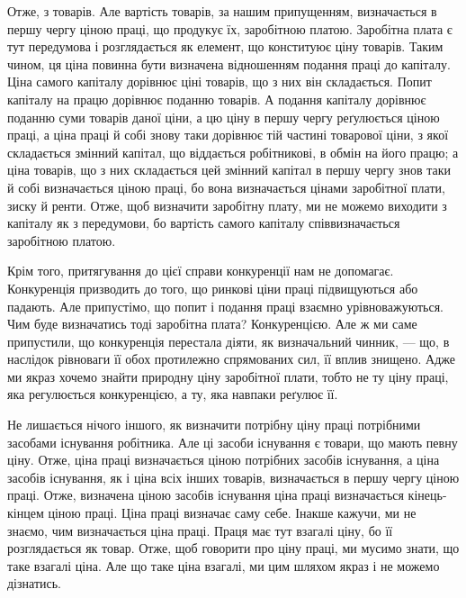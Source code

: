 \parcont{}  %
Отже, з товарів. Але вартість товарів, за нашим припущенням, визначається
в першу чергу ціною праці, що продукує їх, заробітною платою. Заробітна плата
є тут передумова і розглядається як елемент, що конституює ціну товарів. Таким
чином, ця ціна повинна бути визначена відношенням подання праці до капіталу.
Ціна самого капіталу дорівнює ціні товарів, що з них він складається. Попит
капіталу на працю дорівнює поданню товарів. А подання капіталу дорівнює
поданню суми товарів даної ціни, а цю ціну в першу чергу реґулюється
ціною праці, а ціна праці й собі знову таки дорівнює тій частині товарової
ціни, з якої складається змінний капітал, що віддається робітникові, в
обмін на його працю; а ціна товарів, що з них складається цей змінний капітал
в першу чергу знов таки й собі визначається ціною праці, бо вона визначається
цінами заробітної плати, зиску й ренти. Отже, щоб визначити заробітну плату,
ми не можемо виходити з капіталу як з передумови, бо вартість самого капіталу
співвизначається заробітною платою.

Крім того, притягування до цієї справи конкуренції нам не допомагає.
Конкуренція призводить до того, що ринкові ціни праці підвищуються
або падають. Але припустімо, що попит і подання праці взаємно урівноважуються.
Чим буде визначатись тоді заробітна плата? Конкуренцією. Але ж
ми саме припустили, що конкуренція перестала діяти, як визначальний чинник,
— що, в наслідок рівноваги її обох протилежно спрямованих сил, її вплив
знищено. Адже ми якраз хочемо знайти природну ціну заробітної плати,
тобто не ту ціну праці, яка регулюється конкуренцією, а ту, яка навпаки
реґулює її.

Не лишається нічого іншого, як визначити потрібну ціну праці потрібними
засобами існування робітника. Але ці засоби існування є товари, що мають
певну ціну. Отже, ціна праці визначається ціною потрібних засобів існування,
а ціна засобів існування, як і ціна всіх інших товарів, визначається в першу
чергу ціною праці. Отже, визначена ціною засобів існування ціна праці визначається
кінець-кінцем ціною праці. Ціна праці визначає саму себе. Інакше кажучи,
ми не знаємо, чим визначається ціна праці. Праця має тут взагалі ціну,
бо її розглядається як товар. Отже, щоб говорити про ціну праці, ми мусимо
знати, що таке взагалі ціна. Але що таке ціна взагалі, ми цим шляхом якраз
і не можемо дізнатись.

